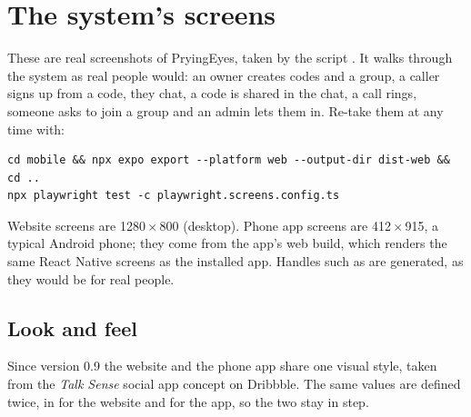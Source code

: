 \chapter{The system's screens}
\label{ch:screens}

These are real screenshots of PryingEyes, taken by the script . It walks through the system as real people would: an owner creates codes and a group, a caller signs up from a code, they chat, a code is shared in the chat, a call rings, someone asks to join a group and an admin lets them in. Re-take them at any time with:

\begin{lstlisting}
cd mobile && npx expo export --platform web --output-dir dist-web && cd ..
npx playwright test -c playwright.screens.config.ts
\end{lstlisting}

Website screens are 1280\,$\times$\,800 (desktop). Phone app screens are 412\,$\times$\,915, a typical Android phone; they come from the app's web build, which renders the same React Native screens as the installed app. Handles such as  are generated, as they would be for real people.

\section{Look and feel}

Since version 0.9 the website and the phone app share one visual style, taken from the \emph{Talk Sense} social app concept on Dribbble. The same values are defined twice, in  for the website and  for the app, so the two stay in step.

